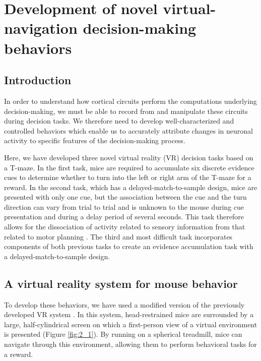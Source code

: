 \chapter{Development of novel virtual-navigation decision-making behaviors} \label{chapter_2}

\section{Introduction}

In order to understand how cortical circuits perform the computations underlying decision-making, we must be able to record from and manipulate these circuits during decision tasks. We therefore need to develop well-characterized and controlled behaviors which enable us to accurately attribute changes in neuronal activity to specific features of the decision-making process. 

\bigskip
Here, we have developed three novel virtual reality (VR) decision tasks based on a T-maze. In the first task, mice are required to accumulate six discrete evidence cues to determine whether to turn into the left or right arm of the T-maze for a reward. In the second task, which has a delayed-match-to-sample design, mice are presented with only one cue, but the association between the cue and the turn direction can vary from trial to trial and is unknown to the mouse during cue presentation and during a delay period of several seconds. This task therefore allows for the dissociation of activity related to sensory information from that related to motor planning \citep{Freedman:2011hq}. The third and most difficult task incorporates components of both previous tasks to create an evidence accumulation task with a delayed-match-to-sample design.

\section{A virtual reality system for mouse behavior} \label{sec:vr}

To develop these behaviors, we have used a modified version of the previously developed VR system \citep{Harvey:2009ci,Harvey:2012du,Dombeck:2010jr}. In this system, head-restrained mice are surrounded by a large, half-cylindrical screen on which a first-person view of a virtual environment is presented (Figure \ref{fig:2_1}). By running on a spherical treadmill, mice can navigate through this environment, allowing them to perform behavioral tasks for a reward.

